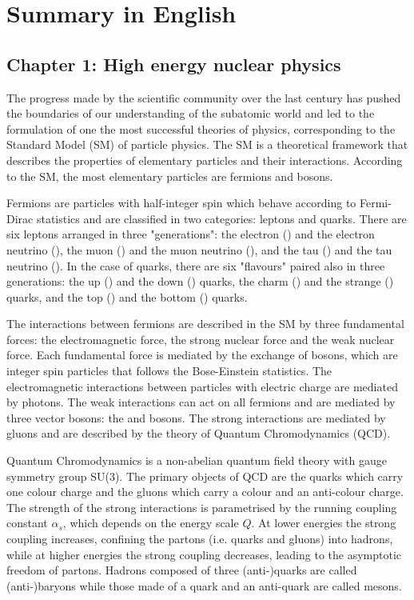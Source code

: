 \chapter{Summary in English}\label{app:Summary_English}


\section{Chapter 1: High energy nuclear physics}

The progress made by the scientific community over the last century has pushed the boundaries of our understanding of the subatomic world and led to the formulation of one the most successful theories of physics, corresponding to the Standard Model (SM) of particle physics. The SM is a theoretical framework that describes the properties of elementary particles and their interactions. According to the SM, the most elementary particles are fermions and bosons.

Fermions are particles with half-integer spin which behave according to Fermi-Dirac statistics and are classified in two categories: leptons and quarks. There are six leptons arranged in three "generations": the electron (\PGem) and the electron neutrino (\PGnGe), the muon (\PGmm) and the muon neutrino (\PGnGm), and the tau (\PGtm) and the tau neutrino (\PGnGt). In the case of quarks, there are six "flavours" paired also in three generations: the up (\cPqu) and the down (\cPqd) quarks, the charm (\cPqc) and the strange (\cPqs) quarks, and the top (\cPqt) and the bottom (\cPqb) quarks.

The interactions between fermions are described in the SM by three fundamental forces: the electromagnetic force, the strong nuclear force and the weak nuclear force. Each fundamental force is mediated by the exchange of bosons, which are integer spin particles that follows the Bose-Einstein statistics. The electromagnetic interactions between particles with electric charge are mediated by photons. The weak interactions can act on all fermions and are mediated by three vector bosons: the \Wpm and {\PZ} bosons. The strong interactions are mediated by gluons and are described by the theory of Quantum Chromodynamics (QCD).

Quantum Chromodynamics is a non-abelian quantum field theory with gauge symmetry group SU(3). The primary objects of QCD are the quarks which carry one colour charge and the gluons which carry a colour and an anti-colour charge. The strength of the strong interactions is parametrised by the running coupling constant $\alpha_{s}$, which depends on the energy scale $Q$. At lower energies the strong coupling  increases, confining the partons (i.e. quarks and gluons) into hadrons, while at higher energies the strong coupling decreases, leading to the asymptotic freedom of partons. Hadrons composed of three (anti-)quarks are called (anti-)baryons while those made of a quark and an anti-quark are called mesons.


